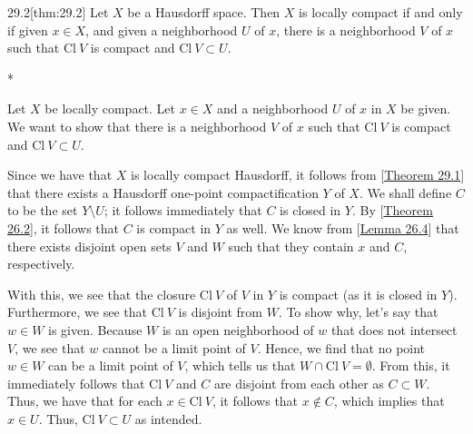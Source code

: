 \begin{thmBox}{29.2}[thm:29.2]
    Let \( X \) be a Hausdorff space.
    Then \( X \) is locally compact if and only if given \( x \in X \), and 
    given a neighborhood \( U \) of \( x \), there is a neighborhood 
    \( V \) of \( x \) such that \( \mathrm{Cl} \ V \) is compact and
    \( \mathrm{Cl} \ V \subset U \).

    \baseRule

    \begin{proofBox}*
        \wrapBox{\( \implies \)}

        Let \( X \) be locally compact.
        Let \( x \in X \) and a neighborhood \( U \) of \( x \) in \( X \) be given.
        We want to show that there is a neighborhood \( V \) of \( x \) such that 
        \( \mathrm{Cl} \ V \) is compact and \( \mathrm{Cl} \ V \subset U \).
        
        \baseSkip 

        Since we have that \( X \) is locally compact Hausdorff, it follows 
        from [\hyperlink{thm:29.1}{Theorem 29.1}] that there exists a Hausdorff 
        one-point compactification \( Y \) of \( X \).
        We shall define \( C \) to be the set \( Y \setminus U \); it follows 
        immediately that \( C \) is closed in \( Y \).
        By [\hyperlink{thm:26.2}{Theorem 26.2}], it follows that \( C \) is compact 
        in \( Y \) as well. 
        We know from [\hyperlink{lem:26.4}{Lemma 26.4}] that there exists disjoint open 
        sets \( V \) and \( W \) such that they contain \( x \) and \( C \), 
        respectively. 

        \baseSkip 

        With this, we see that the closure \( \mathrm{Cl} \ V \) of \( V \) in \( Y \)
        is compact (as it is closed in \( Y \)).
        Furthermore, we see that \( \mathrm{Cl} \ V \) is disjoint from \( W \).
        To show why, let's say that \( w \in W \) is given.
        Because \( W \) is an open neighborhood of \( w \) that does not intersect 
        \( V \), we see that \( w \) cannot be a limit point of \( V \). 
        Hence, we find that no point \( w \in W \) can be a limit point of \( V \),
        which tells us that \( W \cap \mathrm{Cl} \ V = \emptyset \).
        From this, it immediately follows that \( \mathrm{Cl} \ V \) and \( C \) 
        are disjoint from each other as \( C \subset W \). 
        Thus, we have that for each \( x \in \mathrm{Cl} \ V \), it follows that 
        \( x \notin C \), which implies that \( x \in U \).
        Thus, \( \mathrm{Cl} \ V \subset U \) as intended. 


\end{proofBox}
\end{thmBox}
